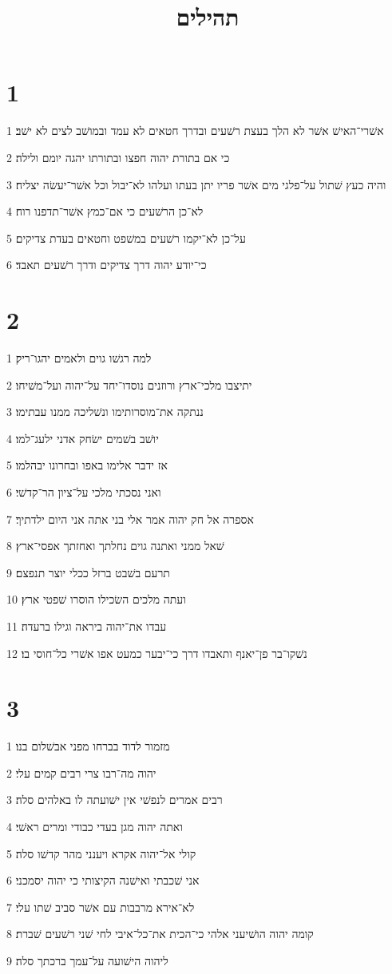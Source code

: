 

\title{תהילים}


\chapter{1}

\par 1 אשׁרי־האישׁ אשׁר לא הלך בעצת רשׁעים ובדרך חטאים לא עמד ובמושׁב לצים לא ישׁב׃
\par 2 כי אם בתורת יהוה חפצו ובתורתו יהגה יומם ולילה׃
\par 3 והיה כעץ שׁתול על־פלגי מים אשׁר פריו יתן בעתו ועלהו לא־יבול וכל אשׁר־יעשׂה יצליח׃
\par 4 לא־כן הרשׁעים כי אם־כמץ אשׁר־תדפנו רוח׃
\par 5 על־כן לא־יקמו רשׁעים במשׁפט וחטאים בעדת צדיקים׃
\par 6 כי־יודע יהוה דרך צדיקים ודרך רשׁעים תאבד׃

\chapter{2}

\par 1 למה רגשׁו גוים ולאמים יהגו־ריק׃
\par 2 יתיצבו מלכי־ארץ ורוזנים נוסדו־יחד על־יהוה ועל־משׁיחו׃
\par 3 ננתקה את־מוסרותימו ונשׁליכה ממנו עבתימו׃
\par 4 יושׁב בשׁמים ישׂחק אדני ילעג־למו׃
\par 5 אז ידבר אלימו באפו ובחרונו יבהלמו׃
\par 6 ואני נסכתי מלכי על־ציון הר־קדשׁי׃
\par 7 אספרה אל חק יהוה אמר אלי בני אתה אני היום ילדתיך׃
\par 8 שׁאל ממני ואתנה גוים נחלתך ואחזתך אפסי־ארץ׃
\par 9 תרעם בשׁבט ברזל ככלי יוצר תנפצם׃
\par 10 ועתה מלכים השׂכילו הוסרו שׁפטי ארץ׃
\par 11 עבדו את־יהוה ביראה וגילו ברעדה׃
\par 12 נשׁקו־בר פן־יאנף ותאבדו דרך כי־יבער כמעט אפו אשׁרי כל־חוסי בו׃

\chapter{3}

\par 1 מזמור לדוד בברחו מפני אבשׁלום בנו׃
\par 2 יהוה מה־רבו צרי רבים קמים עלי׃
\par 3 רבים אמרים לנפשׁי אין ישׁועתה לו באלהים סלה׃
\par 4 ואתה יהוה מגן בעדי כבודי ומרים ראשׁי׃
\par 5 קולי אל־יהוה אקרא ויענני מהר קדשׁו סלה׃
\par 6 אני שׁכבתי ואישׁנה הקיצותי כי יהוה יסמכני׃
\par 7 לא־אירא מרבבות עם אשׁר סביב שׁתו עלי׃
\par 8 קומה יהוה הושׁיעני אלהי כי־הכית את־כל־איבי לחי שׁני רשׁעים שׁברת׃
\par 9 ליהוה הישׁועה על־עמך ברכתך סלה׃

